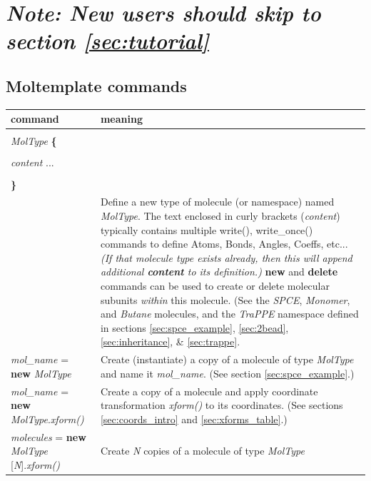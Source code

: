 \documentclass[11pt]{article}
\begin{document}
\section*{
\textit{Note: New users should skip to section \ref{sec:tutorial}}
}


\subsection{Moltemplate commands}

\begin{longtable}[h]{l|p{9cm}}
\textbf{command} & \textbf{meaning}
\\
\hline
\hline
\begin{tabular}[t]{l}
\\
\textit{MolType} \textbf{\{} \\
\\
\hspace{0.35cm} \textit{content} ... \\
\\
\textbf{\}} \\
\end{tabular}
& 
Define a new type of molecule (or namespace) named \textit{MolType}.
The text enclosed in curly brackets (\textit{content})
typically contains multiple write(), write\_once()
commands to define Atoms, Bonds, Angles, Coeffs, etc...
\textit{(If that molecule type exists already, 
then this will append additional \textbf{content} to its definition.)}
\textbf{new} and \textbf{delete} commands can be used 
to create or delete molecular subunits \textit{within} this molecule.
(See the \textit{SPCE}, \textit{Monomer}, and \textit{Butane} 
 molecules, and the \textit{TraPPE} namespace 
 defined in sections \ref{sec:spce_example}, \ref{sec:2bead},
 \ref{sec:inheritance}, \& \ref{sec:trappe}.
\\
\hline
\textit{mol\_name} = \textbf{new} \textit{MolType} &
Create (instantiate) a copy of a molecule of type \textit{MolType}
and name it \textit{mol\_name}.
(See section \ref{sec:spce_example}.)
\\
\hline
\textit{mol\_name} = \textbf{new} \textit{MolType}.\textit{xform()} &
Create a copy of a molecule and
apply coordinate transformation \textit{xform()} to its coordinates.
(See sections \ref{sec:coords_intro} and \ref{sec:xforms_table}.)
\\
\hline
\textit{molecules} = 
  \textbf{new} \textit{MolType} [\textit{N}].\textit{xform()}&
Create \textit{N} copies of a molecule of type \textit{MolType}

\end{longtable}
\end{document}
